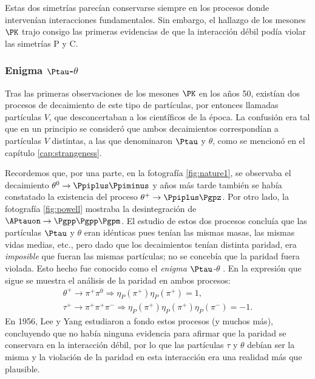 Estas dos simetrías parecían conservarse siempre en los procesos donde intervenían interacciones fundamentales. Sin embargo, el hallazgo de los mesones $\PK$ trajo consigo las primeras evidencias de que la interacción débil podía violar las simetrías P y C.


\subsubsection{Enigma $\Ptau$-$\theta$}
Tras las primeras observaciones de los mesones $\PK$ en los años 50, existían dos procesos de decaimiento de este tipo de partículas, por entonces llamadas partículas $V$, que desconcertaban a los científicos de la época. La confusión era tal que en un principio se consideró que ambos decaimientos correspondían a partículas $V$ distintas, a las que denominaron $\Ptau$ y $\theta$, como se mencionó en el capítulo \ref{cap:strangeness}. 

Recordemos que, por una parte, en la fotografía \ref{fig:nature1}, se observaba el decaimiento $\theta^{0} \rightarrow \Ppiplus\Ppiminus$ y años más tarde también se había constatado la existencia del proceso $\theta^{+} \rightarrow \Ppiplus\Pgpz$. Por otro lado, la fotografía \ref{fig:powell} mostraba la desintegración de $\APtauon \rightarrow \Pgpp\Pgpp\Pgpm$.  El estudio de estos dos procesos concluía que las partículas $\Ptau$ y $\theta$ eran idénticas pues tenían las mismas masas, las mismas vidas medias, etc., pero dado que los decaimientos tenían distinta paridad, era \textit{imposible} que fueran las mismas partículas; no se concebía que la paridad fuera violada. Esto hecho fue conocido como el \textit{enigma $\Ptau$-$\theta$} \cite{Ferbel}. En la expresión que sigue se muestra el análisis de la paridad en ambos procesos:
\begin{equation}
\begin{gathered}
\theta^{+} \rightarrow \pi^{+}\pi^{0} \Rightarrow \eta_{P}\left(\pi^{+}\right) \eta_{P}\left(\pi^{+}\right) = 1 , \\ 
\tau^{+} \rightarrow \pi^{+}\pi^{+}\pi^{-} \Rightarrow \eta_{P}\left(\pi^{+}\right) \eta_{P}\left(\pi^{+}\right) \eta_{P}\left(\pi^{-}\right) = -1 .
\end{gathered}
\end{equation}
En 1956, Lee y Yang estudiaron a fondo estos procesos (y muchos más), concluyendo que no había ninguna evidencia para afirmar que la paridad se conservara en la interacción débil, por lo que las partículas $\tau$ y $\theta$ debían ser la misma y la violación de la paridad en esta interacción era una realidad más que plausible. 

